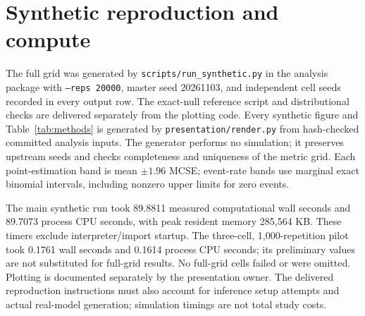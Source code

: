 \section{Synthetic reproduction and compute}
The full grid was generated by \texttt{scripts/run\_synthetic.py} in the analysis package with \texttt{--reps 20000}, master seed 20261103, and independent cell seeds recorded in every output row. The exact-null reference script and distributional checks are delivered separately from the plotting code. Every synthetic figure and Table~\ref{tab:methods} is generated by \texttt{presentation/render.py} from hash-checked committed analysis inputs. The generator performs no simulation; it preserves upstream seeds and checks completeness and uniqueness of the metric grid. Each point-estimation band is mean $\pm1.96$ MCSE; event-rate bands use marginal exact binomial intervals, including nonzero upper limits for zero events.

The main synthetic run took 89.8811 measured computational wall seconds and 89.7073 process CPU seconds, with peak resident memory 285,564 KB. These timers exclude interpreter/import startup. The three-cell, 1,000-repetition pilot took 0.1761 wall seconds and 0.1614 process CPU seconds; its preliminary values are not substituted for full-grid results. No full-grid cells failed or were omitted. Plotting is documented separately by the presentation owner. The delivered reproduction instructions must also account for inference setup attempts and actual real-model generation; simulation timings are not total study costs.
